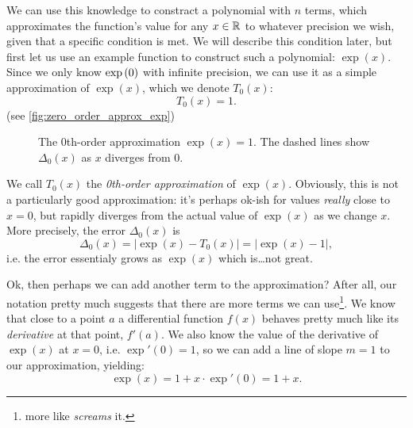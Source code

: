 We can use this knowledge to constract a polynomial with $n$ terms, which approximates the function's value for any $x\in\mathbb{R}^{}$ to whatever precision we wish, given that a specific condition is met. We will describe this condition later, but first let us use an example function to construct such a polynomial: $\exp(x)$. Since we only know $\exp\left(0\right)$ with infinite precision, we can use it as a simple approximation of $\exp(x)$, which we denote $T_{0}(x)$:
\begin{equation}
  T_{0}(x) = 1.
  \label{eq:zero_order_approx_exp}
\end{equation}
(see \autoref{fig:zero_order_approx_exp})

\begin{figure}
  \centering
  \caption{The 0th-order approximation $\exp(x)=1$. The dashed lines show $\Delta_{0}(x)$ as $x$ diverges from $0$.}
  \label{fig:zero_order_approx_exp}
\end{figure}

We call $T_{0}(x)$ the \emph{0th-order approximation} of $\exp(x)$. Obviously, this is not a particularly good approximation: it's perhaps ok-ish for values \textit{really} close to $x=0$, but rapidly diverges from the actual value of $\exp(x)$ as we change $x$. More precisely, the error $\Delta_{0}(x)$ is
\begin{equation}
  \Delta_{0}(x) = \left| \exp(x) - T_{0}(x) \right| = \left| \exp(x)-1 \right|,
  \label{eq:exp_err_0}
\end{equation}
i.e. the error essentialy grows as $\exp(x)$ which is\dots not great.

Ok, then perhaps we can add another term to the approximation? After all, our notation pretty much suggests that there are more terms we can use\footnote{more like \textit{screams} it.}. We know that close to a point $a$ a differential function $f(x)$ behaves pretty much like its \textit{derivative} at that point, $f'(a)$. We also know the value of the derivative of $\exp(x)$ at $x=0$, i.e. $\exp'(0)=1$, so we can add a line of slope $m=1$ to our approximation, yielding:
\begin{equation}
  \exp(x) = 1 + x\cdot\exp'\left(0\right) = 1+x.
  \label{eq:first_order_approx_exp}
\end{equation}

